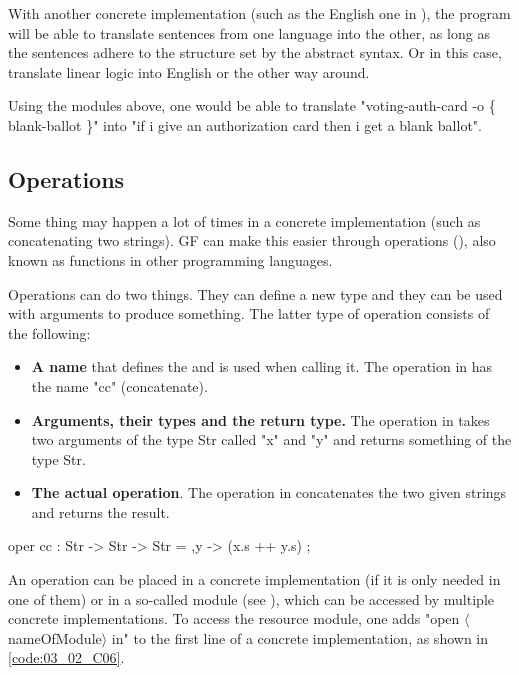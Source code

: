With another concrete implementation (such as the English one in ), the program will be able to translate sentences from one language into the other, as long as the sentences adhere to the structure set by the abstract syntax. Or in this case, translate linear logic into English or the other way around.

Using the modules above, one would be able to translate "voting-auth-card -o \{ blank-ballot \}" into "if i give an authorization card then i get a blank ballot".

\subsection{Operations}
\label{03_02_03}

Some thing may happen a lot of times in a concrete implementation (such as concatenating two strings). GF can make this easier through operations (), also known as functions in other programming languages. 

Operations can do two things. They can define a new type and they can be used with arguments to produce something. The latter type of operation consists of the following:
\begin{itemize}
\item \textbf{A name} that defines the  and is used when calling it. The operation in  has the name "cc" (concatenate).

\item \textbf{Arguments, their types and the return type.} The operation in  takes two arguments of the type Str called "x" and "y" and returns something of the type Str.

\item \textbf{The actual operation}. The operation in  concatenates the two given strings and returns the result.
\end{itemize}

\begin{lstgf}
oper 
    cc : Str -> Str -> Str = \x,y -> (x.s ++ y.s) ;
\end{lstgf}

An operation can be placed in a concrete implementation (if it is only needed in one of them) or in a so-called  module (see ), which can be accessed by multiple concrete implementations. To access the resource module, one adds "open $\langle$nameOfModule$\rangle$ in" to the first line of a concrete implementation, as shown in \ref{code:03_02_C06}. 

